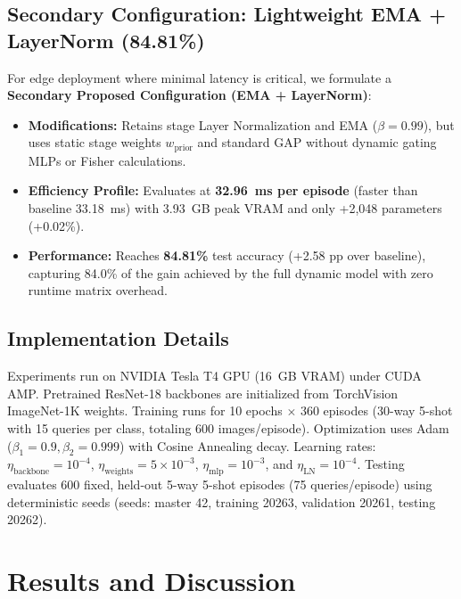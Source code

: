 \documentclass[conference]{IEEEtran}
\begin{document}
\subsection{Secondary Configuration: Lightweight EMA + LayerNorm (84.81\%)}
For edge deployment where minimal latency is critical, we formulate a \textbf{Secondary Proposed Configuration (EMA + LayerNorm)}:
\begin{itemize}
    \item \textbf{Modifications:} Retains stage Layer Normalization and EMA ($\beta=0.99$), but uses static stage weights $w_{\text{prior}}$ and standard GAP without dynamic gating MLPs or Fisher calculations.
    \item \textbf{Efficiency Profile:} Evaluates at \textbf{32.96~ms per episode} (faster than baseline 33.18~ms) with 3.93~GB peak VRAM and only +2,048 parameters (+0.02\%).
    \item \textbf{Performance:} Reaches \textbf{84.81\%} test accuracy (+2.58 pp over baseline), capturing 84.0\% of the gain achieved by the full dynamic model with zero runtime matrix overhead.
\end{itemize}

\subsection{Implementation Details}
Experiments run on NVIDIA Tesla T4 GPU (16~GB VRAM) under CUDA AMP. Pretrained ResNet-18 backbones are initialized from TorchVision ImageNet-1K weights. Training runs for 10 epochs $\times$ 360 episodes (30-way 5-shot with 15 queries per class, totaling 600 images/episode). Optimization uses Adam ($\beta_1=0.9, \beta_2=0.999$) with Cosine Annealing decay. Learning rates: $\eta_{\text{backbone}} = 10^{-4}$, $\eta_{\text{weights}} = 5 \times 10^{-3}$, $\eta_{\text{mlp}} = 10^{-3}$, and $\eta_{\text{LN}} = 10^{-4}$. Testing evaluates 600 fixed, held-out 5-way 5-shot episodes (75 queries/episode) using deterministic seeds (seeds: master 42, training 20263, validation 20261, testing 20262).

\section{Results and Discussion}
\end{document}
